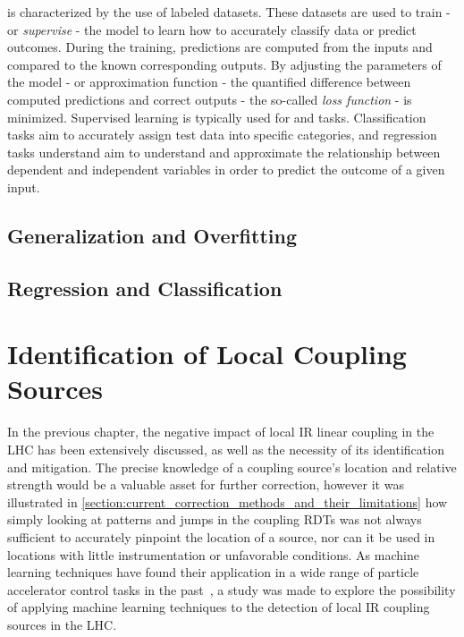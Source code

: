  is characterized by the use of labeled datasets.
These datasets are used to train - or \textit{supervise} - the model to learn how to accurately classify data or predict outcomes.
During the training, predictions are computed from the inputs and compared to the known corresponding outputs.
By adjusting the parameters of the model - or approximation function - the quantified difference between computed predictions and correct outputs - the so-called \textit{loss function} - is minimized.
Supervised learning is typically used for  and  tasks.
Classification tasks aim to accurately assign test data into specific categories, and regression tasks understand aim to understand and approximate the relationship between dependent and independent variables in order to predict the outcome of a given input.

\subsection{Generalization and Overfitting}

\subsection{Regression and Classification}

\section{Identification of Local Coupling Sources}

In the previous chapter, the negative impact of local IR linear coupling in the LHC has been extensively discussed, as well as the necessity of its identification and mitigation.
The precise knowledge of a coupling source's location and relative strength would be a valuable asset for further correction, however it was illustrated in \cref{section:current_correction_methods_and_their_limitations} how simply looking at patterns and jumps in the coupling RDTs was not always sufficient to accurately pinpoint the  location of a source, nor can it be used in locations with little instrumentation or unfavorable conditions.
As machine learning techniques have found their application in a wide range of particle accelerator control tasks in the past~\cite{IPAC:Fol:Machine_Learning_Methods_for_Optics_Measurements_and_Corrections_at_LHC, IEEE:Edelen:Neural_Networks_Modeling_Control_Particle_Accelerators, EPAC:Bozoki:Neural_Networks_Orbit_Control_Accelerators, IPAC:Meier:Orbit_Correction_Studies_using_Neural_Networks, EPAC:Kijima:Beam_Diagnostic_System_for_Accelerator_using_Neural_Networks, PRAB:Fol:Detection_Faulty_BPMs, EPJP:Fol:Supervised_Learning_Reconstruction_Magnet_Errors}, a study was made to explore the possibility of applying machine learning techniques to the detection of local IR coupling sources in the LHC.

